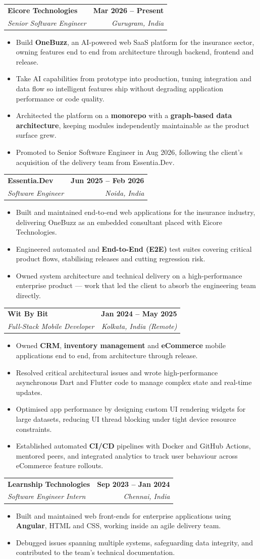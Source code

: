 \documentclass[letterpaper,11pt]{article}
\makeatletter
\newcommand{\resumeItem}[1]{
  \item\small{
    {#1 \vspace{-2pt}}
  }
}
\newcommand{\resumeSubheading}[4]{
  \vspace{-2pt}\item
    \begin{tabular*}{1.0\textwidth}[t]{l@{\extracolsep{\fill}}r}
      \textbf{#1} & \textbf{\small #2} \\
      \textit{\small#3} & \textit{\small #4} \\
    \end{tabular*}\vspace{-7pt}
}
\newcommand{\resumeItemListStart}{\begin{itemize}}
\newcommand{\resumeItemListEnd}{\end{itemize}\vspace{-5pt}}
\makeatother
\begin{document}
    \resumeSubheading
      {Eicore Technologies}{Mar 2026 -- Present}
      {Senior Software Engineer}{Gurugram, India}
      \resumeItemListStart
        \resumeItem{Build \textbf{OneBuzz}, an AI-powered web SaaS platform for the insurance sector, owning features end to end from architecture through backend, frontend and release.}
        \resumeItem{Take AI capabilities from prototype into production, tuning integration and data flow so intelligent features ship without degrading application performance or code quality.}
        \resumeItem{Architected the platform on a \textbf{monorepo} with a \textbf{graph-based data architecture}, keeping modules independently maintainable as the product surface grew.}
        \resumeItem{Promoted to Senior Software Engineer in Aug 2026, following the client's acquisition of the delivery team from Essentia.Dev.}
      \resumeItemListEnd

    \resumeSubheading
      {Essentia.Dev}{Jun 2025 -- Feb 2026}
      {Software Engineer}{Noida, India}
      \resumeItemListStart
        \resumeItem{Built and maintained end-to-end web applications for the insurance industry, delivering OneBuzz as an embedded consultant placed with Eicore Technologies.}
        \resumeItem{Engineered automated and \textbf{End-to-End (E2E)} test suites covering critical product flows, stabilising releases and cutting regression risk.}
        \resumeItem{Owned system architecture and technical delivery on a high-performance enterprise product --- work that led the client to absorb the engineering team directly.}
      \resumeItemListEnd

    \resumeSubheading
      {Wit By Bit}{Jan 2024 -- May 2025}
      {Full-Stack Mobile Developer}{Kolkata, India (Remote)}
      \resumeItemListStart
        \resumeItem{Owned \textbf{CRM}, \textbf{inventory management} and \textbf{eCommerce} mobile applications end to end, from architecture through release.}
        \resumeItem{Resolved critical architectural issues and wrote high-performance asynchronous Dart and Flutter code to manage complex state and real-time updates.}
        \resumeItem{Optimised app performance by designing custom UI rendering widgets for large datasets, reducing UI thread blocking under tight device resource constraints.}
        \resumeItem{Established automated \textbf{CI/CD} pipelines with Docker and GitHub Actions, mentored peers, and integrated analytics to track user behaviour across eCommerce feature rollouts.}
      \resumeItemListEnd

    \resumeSubheading
      {Learnship Technologies}{Sep 2023 -- Jan 2024}
      {Software Engineer Intern}{Chennai, India}
      \resumeItemListStart
        \resumeItem{Built and maintained web front-ends for enterprise applications using \textbf{Angular}, HTML and CSS, working inside an agile delivery team.}
        \resumeItem{Debugged issues spanning multiple systems, safeguarding data integrity, and contributed to the team's technical documentation.}
      \resumeItemListEnd
\end{document}
